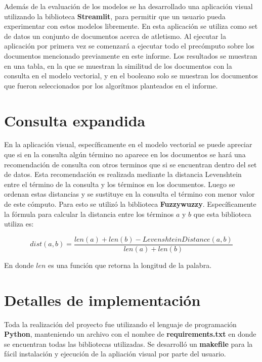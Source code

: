 \documentclass{llncs}
\begin{document}
Además de la evaluación de los modelos se ha desarrollado una aplicación visual utilizando la biblioteca {\bfseries Streamlit}, para permitir que un usuario pueda experimentar con estos modelos libremente. En esta aplicación se utiliza como set de datos un conjunto de documentos acerca de atletismo. Al ejecutar la aplicación por primera vez se comenzará a ejecutar todo el precómputo sobre los documentos mencionado previamente en este informe. Los resultados se muestran en una tabla, en la que se muestran la similitud de los documentos con la consulta en el modelo vectorial, y en el booleano solo se muestran los documentos que fueron seleccionados por los algorítmos planteados en el informe.

\section{Consulta expandida}

En la aplicación visual, específicamente en el modelo vectorial se puede apreciar que si en la consulta algún término no aparece en los documentos se hará una recomendación de consulta con otros terminos que si se encuentran dentro del set de datos. Esta recomendación es realizada mediante la distancia Levenshtein entre el término de la consulta y los términos en los documentos. Luego se ordenan estas distancias y se sustituye en la consulta el término con menor valor de este cómputo. Para esto se utilizó la biblioteca {\bfseries Fuzzywuzzy}. Específicamente la fórmula para calcular la distancia entre los términos $a$ y $b$ que esta biblioteca utiliza es:

\begin{equation}
    dist(a, b) = \frac{len(a) + len(b) - LevenshteinDistance(a, b)}{len(a) + len(b)}
\end{equation}

En donde $len$ es una función que retorna la longitud de la palabra.

\section{Detalles de implementación}

Toda la realización del proyecto fue utilizando el lenguaje de programación {\bfseries Python}, manteniendo un archivo con el nombre de {\bfseries requirements.txt} en donde se encuentran todas las bibliotecas utilizadas. Se desarrolló un {\bfseries makefile} para la fácil instalación y ejecución de la apliación visual por parte del usuario.
\end{document}
